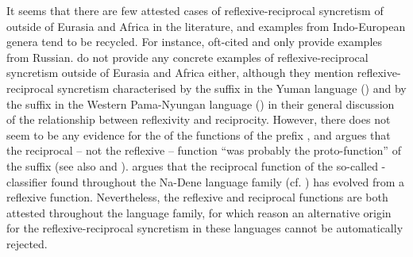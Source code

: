 It seems that there are few attested cases of reflexive-reciprocal syncretism of  outside of Eurasia and Africa in the literature, and examples from Indo-European genera tend to be recycled. For instance, oft-cited \citet[254]{heine:kuteva:2002} and \citet[233ff.]{maslova:2008} only provide examples from Russian. \citet{heine:miyashita:2008} do not provide any concrete examples of reflexive-reciprocal syncretism outside of Eurasia and Africa either, although they mention reflexive-reciprocal syncretism characterised by the suffix  in the Yuman language  () and by the suffix  in the Western Pama-Nyungan language  () in their general discussion of the relationship between reflexivity and reciprocity. However, there does not seem to be any evidence for the  of the functions of the  prefix \citep{watahomigie:al:1982, sohn:j-s:1995, ichihashi-nakayama:al:1997}, and \citet[149]{waters:1989} argues that the reciprocal -- not the reflexive -- function “was probably the proto-function” of the  suffix (see also  and \citealt[199f.]{heine:miyashita:2008}). \citet[375]{thompson:1996} argues that the reciprocal function of the so-called -classifier found throughout the Na-Dene language family (cf.  ) has evolved from a reflexive function. Nevertheless, the reflexive and reciprocal functions are both attested throughout the language family, for which reason an alternative origin for the reflexive-reciprocal syncretism in these languages cannot be automatically rejected.

